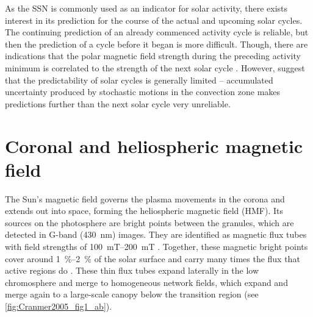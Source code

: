 As the SSN is commonly used as an indicator for solar activity, there exists interest in its prediction for the course of the actual and upcoming solar cycles. The continuing prediction of an already commenced activity cycle is reliable, but then the prediction of a cycle before it began is more difficult. Though, there are indications that the polar magnetic field strength during the preceding activity minimum is correlated to the strength of the next solar cycle \citep{Schatten1987}. However, \citet{Hathaway2016} suggest that the predictability of solar cycles is generally limited -- accumulated uncertainty produced by stochastic motions in the convection zone makes predictions further than the next solar cycle very unreliable.

\clearpage

\section{Coronal and heliospheric magnetic field}
\label{sec:coronal_and_heliospheric_magnetic_field}
The Sun's magnetic field governs the plasma movements in the corona and extends out into space, forming the heliospheric magnetic field (HMF). Its sources on the photosphere are bright points between the granules, which are detected in G-band (\SI{430}{\nano\meter}) images. They are identified as magnetic flux tubes with field strengths of \SIrange{100}{200}{\milli\tesla} \citep{Cranmer2005}. Together, these magnetic bright points cover around \SIrange{1}{2}{\%} of the solar surface and carry many times the flux that active regions do \citep{Sanchez_Almeida2010}. These thin flux tubes expand laterally in the low chromosphere and merge to homogeneous network fields, which expand and merge again to a large-scale canopy below the transition region (see \autoref{fig:Cranmer2005_fig1_ab}).
